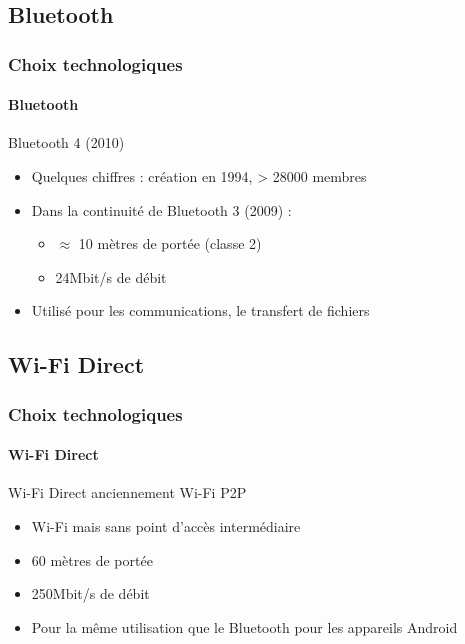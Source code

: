 \documentclass{beamer}
\begin{document}
    \subsection{Bluetooth}
    \begin{frame}
      \frametitle{Choix technologiques}
      \framesubtitle{Bluetooth}
      \begin{block}{Bluetooth 4 (2010)}
        \begin{itemize}
          \item Quelques chiffres : création en 1994, > 28000 membres
          \item Dans la continuité de Bluetooth 3 (2009) :
          \begin{itemize}
            \item $ \approx $ 10 mètres de portée (classe 2)
            \item 24Mbit/s de débit
          \end{itemize}
          \item Utilisé pour les communications, le transfert de fichiers
        \end{itemize}
      \end{block}
    \end{frame}
    \subsection{Wi-Fi Direct}
    \begin{frame}
      \frametitle{Choix technologiques}
      \framesubtitle{Wi-Fi Direct}
      \begin{block}{Wi-Fi Direct anciennement Wi-Fi P2P}
        \begin{itemize}
          \item Wi-Fi mais sans point d'accès intermédiaire
          \item 60 mètres de portée
          \item 250Mbit/s de débit
          \item Pour la même utilisation que le Bluetooth pour les appareils Android
        \end{itemize}
      \end{block}
    \end{frame}
\end{document}
